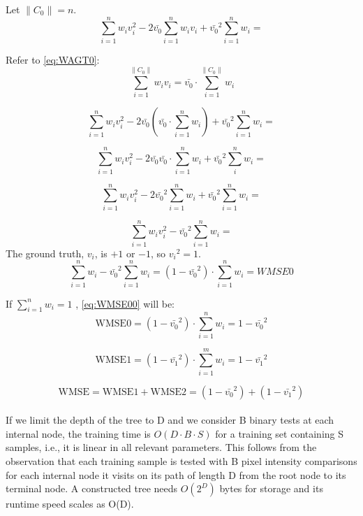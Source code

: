 \documentclass[a4paper,12pt]{article}
\begin{document}
Let $\| C_{0} \|=n$.\\

\[\sum_{i=1}^{n} w_i v_i^2 - 2\bar{v_0}\sum_{i=1}^{n} w_i v_i + 
\bar{v_0}^2\sum_{i=1}^{n} w_i=\]

Refer to \eqref{eq:WAGT0}:
\[
\sum_{i=1}^{\| C_0 \|}  w_i v_i = \bar{v_0} \cdot \sum_{i=1}^{\| C_0 \|}  w_i
\]

\[\sum_{i=1}^{n} w_i v_i^2 - 2\bar{v_0} (\bar{v_0} \cdot \sum_{i=1}^n w_i) + 
\bar{v_0}^2\sum_{i=1}^{n} w_i=\]

\[\sum_{i=1}^{n} w_i v_i^2 - 2\bar{v_0} \bar{v_0} \cdot \sum_{i=1}^n w_i 
+ \bar{v_0}^2\sum_i^n w_i=\]

\[\sum_{i=1}^{n} w_i v_i^2 - 2\bar{v_0}^2 \sum_{i=1}^n w_i  + 
\bar{v_0}^2 \sum_{i=1}^n w_i=\]

\[\sum_{i=1}^{n} w_i v_i^2 - \bar{v_0}^2 \sum_{i=1}^n w_i = \]
The ground truth, $v_i$, is $+1$ or $-1$, so ${v_i}^2=1$.\\

\begin{equation}
\label{eq:WMSE00}
\sum_{i=1}^{n} w_i - \bar{v_0}^2 \sum_{i=1}^n w_i =
(1 - \bar{v_0}^2) \cdot \sum_{i=1}^{n} w_i = WMSE0
\end{equation}

If $\sum_{i=1}^{n} w_i =1$ , \eqref{eq:WMSE00} will be:
\begin{equation}
\label{eq:WMSE0}
\text{WMSE0} = (1 - \bar{v_0}^2) \cdot \sum_{i=1}^{n} w_i = 1-\bar{v_0}^2
\end{equation}

\begin{equation}
\label{eq:WMSE1}
\text{WMSE1} = (1 - \bar{v_1}^2) \cdot \sum_{i=1}^{m} w_i = 1-\bar{v_1}^2
\end{equation}

\begin{equation}
\label{eq:WMSE_01}
\text{WMSE} = \text{WMSE1} + \text{WMSE2} = (1-\bar{v_0}^2) + (1-\bar{v_1}^2) 
\end{equation}\\

If we limit the depth of the tree to D and we consider
B binary tests at each internal node, the training time is
$O(D \cdot B \cdot S)$ for a training set containing S samples, i.e., it
is linear in all relevant parameters. This follows from the
observation that each training sample is tested with B pixel
intensity comparisons for each internal node it visits on its
path of length D from the root node to its terminal node. A
constructed tree needs $O(2^D)$ bytes for storage and its runtime
speed scales as O(D).
\end{document}
